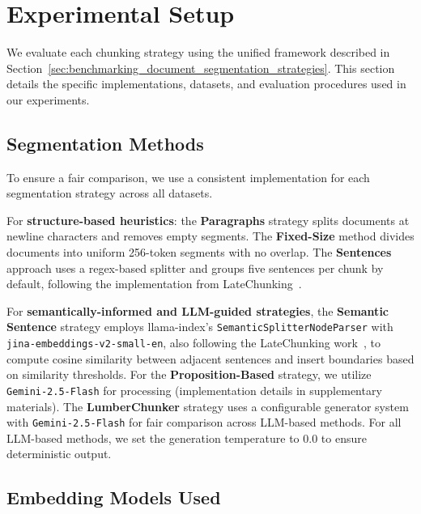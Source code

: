 \section{Experimental Setup}

We evaluate each chunking strategy using the unified framework described in Section~\ref{sec:benchmarking_document_segmentation_strategies}. This section details the specific implementations, datasets, and evaluation procedures used in our experiments.

\subsection{Segmentation Methods}
To ensure a fair comparison, we use a consistent implementation for each segmentation strategy across all datasets.

For \textbf{structure-based heuristics}: the \textbf{Paragraphs} strategy splits documents at newline characters and removes empty segments. The \textbf{Fixed-Size} method divides documents into uniform 256-token segments with no overlap. The \textbf{Sentences} approach uses a regex-based splitter and groups five sentences per chunk by default, following the implementation from LateChunking~\cite{latechunking2024}.

For \textbf{semantically-informed and LLM-guided strategies}, the \textbf{Semantic Sentence} strategy employs llama-index's \texttt{SemanticSplitterNodeParser} with \texttt{jina-embeddings-v2-small-en}, also following the LateChunking work~\cite{latechunking2024}, to compute cosine similarity between adjacent sentences and insert boundaries based on similarity thresholds. For the \textbf{Proposition-Based} strategy, we utilize \texttt{Gemini-2.5-Flash} for processing (implementation details in supplementary materials). The \textbf{LumberChunker} strategy uses a configurable generator system with \texttt{Gemini-2.5-Flash} for fair comparison across LLM-based methods. For all LLM-based methods, we set the generation temperature to 0.0 to ensure deterministic output.

\subsection{Embedding Models Used}

